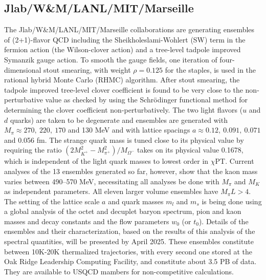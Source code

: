 \documentclass[a4paper,11pt]{article}
\begin{document}
\subsection{Jlab/W\&M/LANL/MIT/Marseille}
The Jlab/W\&M/LANL/MIT/Marseille collaborations are generating
ensembles of (2+1)-flavor QCD including the Sheikholeslami-Wohlert
(SW) term in the fermion action (the Wilson-clover action) and a
tree-level tadpole improved Symanzik gauge action. To smooth the gauge
fields, one iteration of four-dimensional stout smearing, with weight
$\rho = 0.125$ for the staples, is used in the rational hybrid Monte
Carlo (RHMC) algorithm.  After stout smearing, the tadpole improved
tree-level clover coefficient is found to be very close to the
non-perturbative value as checked by using the Schr\"odinger
functional method for determining the clover coefficient
non-perturbatively. The two light flavors ($u$ and $d$ quarks) are
taken to be degenerate and ensembles are generated with $M_\pi \approx
270,\ 220,\ 170$ and 130 MeV and with lattice spacings $a \approx
0.12,\ 0.091,\ 0.071$ and 0.056 fm. The strange quark mass is tuned
close to its physical value by requiring the ratio $(2M_{K^+}^2 -
M_{\pi^+}^2)/M_{\Omega^-}$ takes on its physical value 0.1678, which
is independent of the light quark masses to lowest order in
$\chi$PT. Current analyses of the 13 ensembles generated so far,
however, show that the kaon mass varies between 490--570 MeV,
necessitating all analyses be done with $M_\pi$ and $M_K$ as
independent parameters.  All eleven larger volume ensembles have
$M_\pi L > 4$.  The setting of the lattice scale $a$ and quark masses
$m_l$ and $m_s$ is being done using a global analysis of the octet and
decuplet baryon spectrum, pion and kaon masses and decay constants and
the flow parameters $w_0$ (or $t_0$). Details of the ensembles and
their characterization, based on the results of this analysis of the
spectral quantities, will be presented by April 2025. These ensembles
constitute between 10K-20K thermalized trajectories, with every second
one stored at the Oak Ridge Leadership Computing Facility, and
constitute about 3.5 PB of data. They are available to USQCD mambers
for non-competitive calculations.

\end{document}
